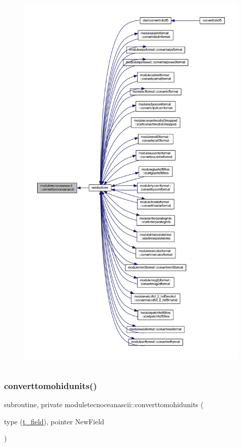 \begin{figure}[H]
\begin{center}
\leavevmode
\includegraphics[height=550pt]{namespacemoduletecnoceanascii_a911ff8ebfeb289d3cf85e2a5a6543289_icgraph}
\end{center}
\end{figure}
\mbox{\label{namespacemoduletecnoceanascii_acb08e8b922f987a8851cdd00f46ab1ac}} 
\subsubsection{\texorpdfstring{converttomohidunits()}{converttomohidunits()}}
{\footnotesize\ttfamily subroutine, private moduletecnoceanascii\+::converttomohidunits (\begin{DoxyParamCaption}\item[{type (\mbox{\hyperlink{structmoduletecnoceanascii_1_1t__field}{t\+\_\+field}}), pointer}]{New\+Field }\end{DoxyParamCaption})\hspace{0.3cm}{\ttfamily [private]}}


